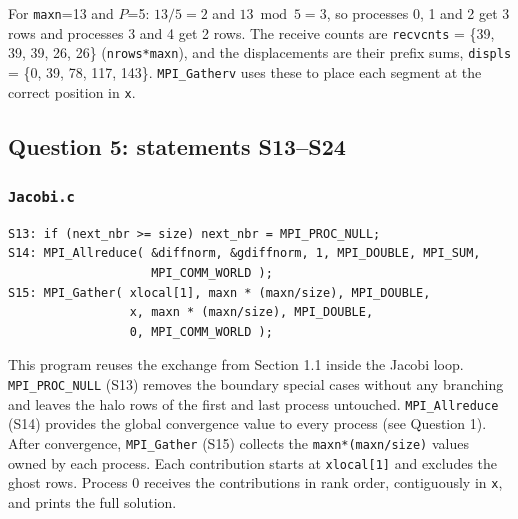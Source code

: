 \documentclass[11pt,a4paper]{article}
\begin{document}
For \texttt{maxn}=13 and $P$=5: $13/5 = 2$ and $13 \bmod 5 = 3$, so processes 0, 1 and 2 get 3 rows and processes 3 and 4 get 2 rows. The receive counts are \texttt{recvcnts} = \{39, 39, 39, 26, 26\} (\texttt{nrows*maxn}), and the displacements are their prefix sums, \texttt{displs} = \{0, 39, 78, 117, 143\}. \texttt{MPI\_Gatherv} uses these to place each segment at the correct position in \texttt{x}.

\subsection*{Question 5: statements S13--S24}

\subsubsection*{\texttt{Jacobi.c}}
\begin{lstlisting}
S13: if (next_nbr >= size) next_nbr = MPI_PROC_NULL;
S14: MPI_Allreduce( &diffnorm, &gdiffnorm, 1, MPI_DOUBLE, MPI_SUM,
                    MPI_COMM_WORLD );
S15: MPI_Gather( xlocal[1], maxn * (maxn/size), MPI_DOUBLE,
                 x, maxn * (maxn/size), MPI_DOUBLE,
                 0, MPI_COMM_WORLD );
\end{lstlisting}
This program reuses the exchange from Section 1.1 inside the Jacobi loop. \texttt{MPI\_PROC\_NULL} (S13) removes the boundary special cases without any branching and leaves the halo rows of the first and last process untouched. \texttt{MPI\_Allreduce} (S14) provides the global convergence value to every process (see Question 1). After convergence, \texttt{MPI\_Gather} (S15) collects the \texttt{maxn*(maxn/size)} values owned by each process. Each contribution starts at \texttt{xlocal[1]} and excludes the ghost rows. Process 0 receives the contributions in rank order, contiguously in \texttt{x}, and prints the full solution.
\end{document}
